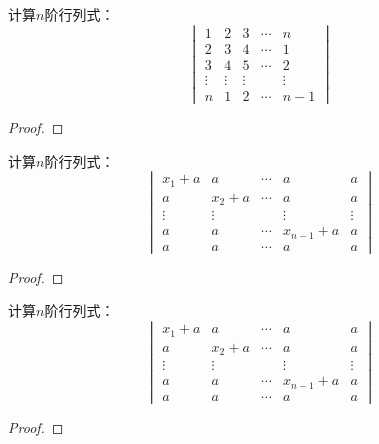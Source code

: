 \begin{problem}
计算\(n\)阶行列式：
\begin{equation*}
    \begin{vmatrix}
        1      & 2      & 3      & \cdots & n      \\
        2      & 3      & 4      & \cdots & 1      \\
        3      & 4      & 5      & \cdots & 2      \\
        \vdots & \vdots & \vdots &        & \vdots \\
        n      & 1      & 2      & \cdots & n-1
    \end{vmatrix}
\end{equation*}
\end{problem}
\begin{proof}
\end{proof}

\begin{problem}
计算\(n\)阶行列式：
\begin{equation*}
    \begin{vmatrix}
        x_{1}+a & a       & \cdots & a         & a      \\
        a       & x_{2}+a & \cdots & a         & a      \\
        \vdots  & \vdots  &        & \vdots    & \vdots \\
        a       & a       & \cdots & x_{n-1}+a & a      \\
        a       & a       & \cdots & a         & a
    \end{vmatrix}
\end{equation*}
\end{problem}
\begin{proof}
\end{proof}

\begin{problem}
计算\(n\)阶行列式：
\begin{equation*}
    \begin{vmatrix}
        x_1+a  & a      & \cdots & a         & a      \\
        a      & x_2+a  & \cdots & a         & a      \\
        \vdots & \vdots &        & \vdots    & \vdots \\
        a      & a      & \cdots & x_{n-1}+a & a      \\
        a      & a      & \cdots & a         & a
    \end{vmatrix}
\end{equation*}
\end{problem}
\begin{proof}
\end{proof}

